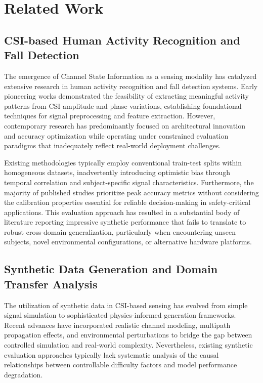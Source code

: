 \documentclass[10pt,conference]{IEEEtran}
\begin{document}
\section{Related Work}

\subsection{CSI-based Human Activity Recognition and Fall Detection}

The emergence of Channel State Information as a sensing modality has catalyzed extensive research in human activity recognition and fall detection systems. Early pioneering works demonstrated the feasibility of extracting meaningful activity patterns from CSI amplitude and phase variations, establishing foundational techniques for signal preprocessing and feature extraction. However, contemporary research has predominantly focused on architectural innovation and accuracy optimization while operating under constrained evaluation paradigms that inadequately reflect real-world deployment challenges.

Existing methodologies typically employ conventional train-test splits within homogeneous datasets, inadvertently introducing optimistic bias through temporal correlation and subject-specific signal characteristics. Furthermore, the majority of published studies prioritize peak accuracy metrics without considering the calibration properties essential for reliable decision-making in safety-critical applications. This evaluation approach has resulted in a substantial body of literature reporting impressive synthetic performance that fails to translate to robust cross-domain generalization, particularly when encountering unseen subjects, novel environmental configurations, or alternative hardware platforms.

\subsection{Synthetic Data Generation and Domain Transfer Analysis}

The utilization of synthetic data in CSI-based sensing has evolved from simple signal simulation to sophisticated physics-informed generation frameworks. Recent advances have incorporated realistic channel modeling, multipath propagation effects, and environmental perturbations to bridge the gap between controlled simulation and real-world complexity. Nevertheless, existing synthetic evaluation approaches typically lack systematic analysis of the causal relationships between controllable difficulty factors and model performance degradation.
\end{document}
